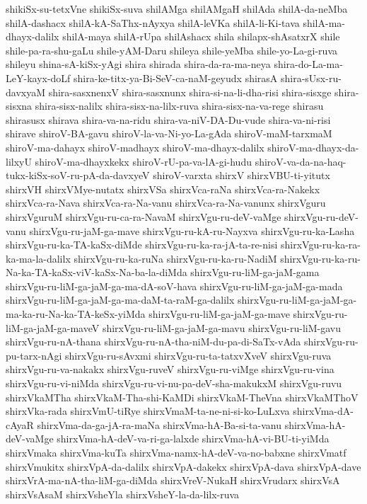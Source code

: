 {shikiSx-su-tetxVne
shikiSx-suva
shilAMga
shilAMgaH
shilAda
shilA-da-neMba
shilA-dashacx
shilA-kA-SaThx-nAyxya
shilA-leVKa
shilA-li-Ki-tava
shilA-ma-dhayx-dalilx
shilA-maya
shilA-rUpa
shilAshacx
shila
shilapx-shAsatxrX
shile
shile-pa-ra-shu-gaLu
shile-yAM-Daru
shileya
shile-yeMba
shile-yo-La-gi-ruva
shileyu
shina-sA-kiSx-yAgi
shira
shirada
shira-da-ra-ma-neya
shira-do-La-ma-LeY-kayx-doLf
shira-ke-titx-ya-Bi-SeV-ca-naM-geyudx
shirasA
shira-sUsx-ru-davxyaM
shira-sasxnenxV
shira-sasxnunx
shira-si-na-li-dha-risi
shira-sisxge
shira-sisxna
shira-sisx-nalilx
shira-sisx-na-lilx-ruva
shira-sisx-na-va-rege
shirasu
shirasusx
shirava
shira-va-na-ridu
shira-va-niV-DA-Du-vude
shira-va-ni-risi
shirave
shiroV-BA-gavu
shiroV-la-va-Ni-yo-La-gAda
shiroV-maM-tarxmaM
shiroV-ma-dahayx
shiroV-madhayx
shiroV-ma-dhayx-dalilx
shiroV-ma-dhayx-da-lilxyU
shiroV-ma-dhayxkekx
shiroV-rU-pa-va-lA-gi-hudu
shiroV-va-da-na-haq-tukx-kiSx-soV-ru-pA-da-davxyeV
shiroV-varxta
shirxV
shirxVBU-ti-yitutx
shirxVH
shirxVMye-nutatx
shirxVSa
shirxVca-raNa
shirxVca-ra-Nakekx
shirxVca-ra-Nava
shirxVca-ra-Na-vanu
shirxVca-ra-Na-vanunx
shirxVguru
shirxVguruM
shirxVgu-ru-ca-ra-NavaM
shirxVgu-ru-deV-vaMge
shirxVgu-ru-deV-vanu
shirxVgu-ru-jaM-ga-mave
shirxVgu-ru-kA-ru-Nayxva
shirxVgu-ru-ka-Lasha
shirxVgu-ru-ka-TA-kaSx-diMde
shirxVgu-ru-ka-ra-jA-ta-re-nisi
shirxVgu-ru-ka-ra-ka-ma-la-dalilx
shirxVgu-ru-ka-ruNa
shirxVgu-ru-ka-ru-NadiM
shirxVgu-ru-ka-ru-Na-ka-TA-kaSx-viV-kaSx-Na-ba-la-diMda
shirxVgu-ru-liM-ga-jaM-gama
shirxVgu-ru-liM-ga-jaM-ga-ma-dA-soV-hava
shirxVgu-ru-liM-ga-jaM-ga-mada
shirxVgu-ru-liM-ga-jaM-ga-ma-daM-ta-raM-ga-dalilx
shirxVgu-ru-liM-ga-jaM-ga-ma-ka-ru-Na-ka-TA-keSx-yiMda
shirxVgu-ru-liM-ga-jaM-ga-mave
shirxVgu-ru-liM-ga-jaM-ga-maveV
shirxVgu-ru-liM-ga-jaM-ga-mavu
shirxVgu-ru-liM-gavu
shirxVgu-ru-nA-thana
shirxVgu-ru-nA-tha-niM-du-pa-di-SaTx-vAda
shirxVgu-ru-pu-tarx-nAgi
shirxVgu-ru-sAvxmi
shirxVgu-ru-ta-tatxvXveV
shirxVgu-ruva
shirxVgu-ru-va-nakakx
shirxVgu-ruveV
shirxVgu-ru-viMge
shirxVgu-ru-vina
shirxVgu-ru-vi-niMda
shirxVgu-ru-vi-nu-pa-deV-sha-makukxM
shirxVgu-ruvu
shirxVkaMTha
shirxVkaM-Tha-shi-KaMDi
shirxVkaM-TheVna
shirxVkaMThoV
shirxVka-rada
shirxVmU-tiRye
shirxVmaM-ta-ne-ni-si-ko-LuLxva
shirxVma-dA-cAyaR
shirxVma-da-ga-jA-ra-maNa
shirxVma-hA-Ba-si-ta-vanu
shirxVma-hA-deV-vaMge
shirxVma-hA-deV-va-ri-ga-lalxde
shirxVma-hA-vi-BU-ti-yiMda
shirxVmaka
shirxVma-kuTa
shirxVma-namx-hA-deV-va-no-babxne
shirxVmatf
shirxVmukitx
shirxVpA-da-dalilx
shirxVpA-dakekx
shirxVpA-dava
shirxVpA-dave
shirxVrA-ma-nA-tha-liM-ga-diMda
shirxVreV-NukaH
shirxVrudarx
shirxVsA
shirxVsAsaM
shirxVsheYla
shirxVsheY-la-da-lilx-ruva
}
